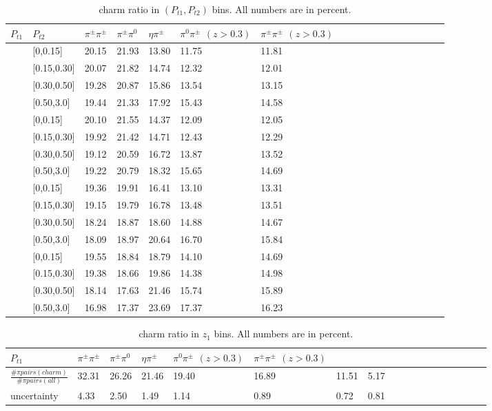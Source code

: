 \begin{table}[H]\footnotesize
\centering
\begin{tabular}{|l|l|l|l|l|l|l|l|l|l|l|l|l|l|l|l|l|l|}
\hline
$P_{t1}$ & $P_{t2}$ &$\pi^{\pm}\pi^{\pm}$ & $\pi^{\pm}\pi^0$ & $\eta\pi^{\pm}$ & $\pi^0\pi^{\pm}$ $(z>0.3)$ & $\pi^{\pm}\pi^{\pm}$ $(z>0.3)$ \\ \hline
[0,0.15]	&	[0,0.15]	&	20.15	&	21.93	&	13.80	&	11.75	&	11.81	\\ \hline
[0,0.15]	&	[0.15,0.30]	&	20.07	&	21.82	&	14.74	&	12.32	&	12.01	\\ \hline
[0,0.15]	&	[0.30,0.50]	&	19.28	&	20.87	&	15.86	&	13.54	&	13.15	\\ \hline
[0,0.15]	&	[0.50,3.0]	&	19.44	&	21.33	&	17.92	&	15.43	&	14.58	\\ \hline
[0.15,0.30]	&	[0,0.15]	&	20.10	&	21.55	&	14.37	&	12.09	&	12.05	\\ \hline
[0.15,0.30]	&	[0.15,0.30]	&	19.92	&	21.42	&	14.71	&	12.43	&	12.29	\\ \hline
[0.15,0.30]	&	[0.30,0.50]	&	19.12	&	20.59	&	16.72	&	13.87	&	13.52	\\ \hline
[0.15,0.30]	&	[0.50,3.0]	&	19.22	&	20.79	&	18.32	&	15.65	&	14.69	\\ \hline
[0.30,0.50]	&	[0,0.15]	&	19.36	&	19.91	&	16.41	&	13.10	&	13.31	\\ \hline
[0.30,0.50]	&	[0.15,0.30]	&	19.15	&	19.79	&	16.78	&	13.48	&	13.51	\\ \hline
[0.30,0.50]	&	[0.30,0.50]	&	18.24	&	18.87	&	18.60	&	14.88	&	14.67	\\ \hline
[0.30,0.50]	&	[0.50,3.0]	&	18.09	&	18.97	&	20.64	&	16.70	&	15.84	\\ \hline
[0.50,3.0]	&	[0,0.15]	&	19.55	&	18.84	&	18.79	&	14.10	&	14.69	\\ \hline
[0.50,3.0]	&	[0.15,0.30]	&	19.38	&	18.66	&	19.86	&	14.38	&	14.98	\\ \hline
[0.50,3.0]	&	[0.30,0.50]	&	18.14	&	17.63	&	21.46	&	15.74	&	15.89	\\ \hline
[0.50,3.0]	&	[0.50,3.0]	&	16.98	&	17.37	&	23.69	&	17.37	&	16.23	\\ \hline
\end{tabular}
\caption{charm ratio in $(P_{t1},P_{t2})$ bins. All numbers are in percent.}
\label{tab:comptcharmratio}
\end{table}
\iffalse
\begin{table}[H]\footnotesize
\centering
\begin{tabular}{|l|l|l|l|l|l|l|l|l|l|l|l|l|l|l|l|l|l|}
\hline
$P_{t1}$ & $\pi^{\pm}\pi^{\pm}$ & $\pi^{\pm}\pi^0$ & $\eta\pi^{\pm}$ & $\pi^0\pi^{\pm}$ $(z>0.3)$ & $\pi^{\pm}\pi^{\pm}$ $(z>0.3)$ \\ \hline
$\frac{\# \pi pairs(charm)}{\# \pi pairs(all)}$ & 32.31 & 26.26 & 21.46 & 19.40 & 16.89 & 11.51 & 5.17 \\ \hline
uncertainty & 4.33 & 2.50 & 1.49 & 1.14 & 0.89 & 0.72 & 0.81 \\ \hline
\end{tabular}
\caption{charm ratio in $z_1$ bins. All numbers are in percent.}
\label{tab:sinzcharmratio}
\end{table}

